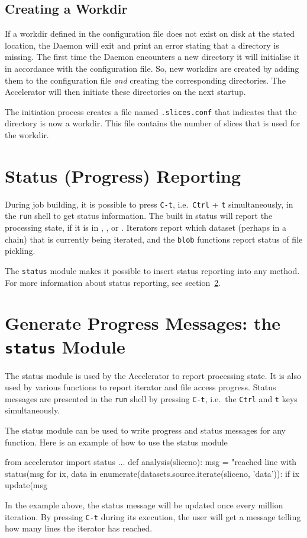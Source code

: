 \subsection{Creating a Workdir}
If a workdir defined in the configuration file does not exist on disk
at the stated location, the Daemon will exit and print an error
stating that a directory is missing.  The first time the Daemon
encounters a new directory it will initialise it in accordance with
the configuration file.  So, new workdirs are created by adding them
to the configuration file \textsl{and} creating the corresponding
directories.  The Accelerator will then initiate these directories on
the next startup.

The initiation process creates a file named \texttt{.slices.conf} that
indicates that the directory is now a workdir.  This file contains the
number of slices that is used for the workdir.



\section{Status (Progress) Reporting}
During job building, it is possible to press \texttt{C-t},
i.e.\ \texttt{Ctrl} + \texttt{t} simultaneously, in the \texttt{run}
shell to get status information.  The built in status will report the
processing state, if it is in \prepare, \analysis, or \synthesis.
Iterators report which dataset (perhaps in a chain) that is currently
being iterated, and the \texttt{blob} functions report status of file
pickling.

The \texttt{status} module makes it possible to insert
status reporting into any method.  For more information about status
reporting, see section~\ref{sec:statusreporting}.



\section{Generate Progress Messages:  the \texttt{status} Module}
\label{sec:statusreporting}
The status module is used by the Accelerator to report processing
state.  It is also used by various functions to report iterator and
file access progress.  Status messages are presented in
the \texttt{run} shell by pressing \texttt{C-t}, i.e.\
the \texttt{Ctrl} and \texttt{t} keys simultaneously.

The status module can be used to write progress and status messages
for any function.  Here is an example of how to use the status module
\begin{python}
from accelerator import status
...
def analysis(sliceno):
    msg = "reached line %
    with status(msg %
        for ix, data in enumerate(datasets.source.iterate(sliceno, 'data')):
            if ix %
                update(msg %
\end{python}
In the example above, the status message will be updated once every
million iteration.  By pressing \texttt{C-t} during its execution, the
user will get a message telling how many lines the iterator has
reached.



